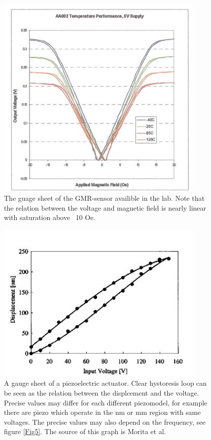 \documentclass[a4paper,11pt]{article} %
\begin{document}
\begin{figure}[H]\label{Fig3}
  \centering
  \includegraphics[width=0.9\textwidth]{ijk GMR.png}
  \caption{The guage sheet of the GMR-sensor availible in the lab. Note that the relation between the voltage and magnetic field is nearly linear with saturation above ~10 Oe.} 
\end{figure}

\begin{figure}[H]\label{Fig4}
  \centering
  \includegraphics[width=0.9\textwidth]{guage.jpg}
  \caption{A gauge sheet of a piezoelectric actuator. Clear hystoresis loop can be seen as the relation between the displcement and the voltage. Precise values may differ for each different piezomodel, for example there are piezo which operate in the nm or mm region with same voltages. The precise values may also depend on the frequency, see figure \ref{Fig5}. The source of this graph is Morita et al.\cite{guage}} 
\end{figure}
\end{document}
